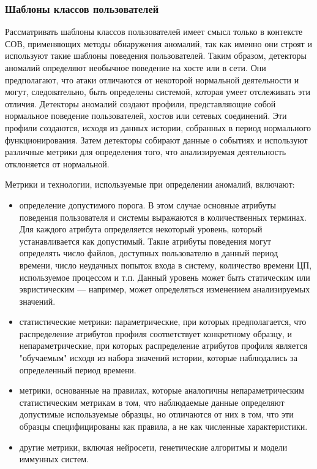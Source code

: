 \subsubsection{Шаблоны классов пользователей}

Рассматривать шаблоны классов пользователей имеет смысл только в контексте СОВ, применяющих методы 
обнаружения аномалий, так как именно они строят и используют такие шаблоны поведения пользователей.
Таким образом, детекторы аномалий определяют необычное поведение на хосте или в сети. 
Они предполагают, что атаки отличаются от некоторой нормальной деятельности и могут, следовательно, 
быть определены системой, которая умеет отслеживать эти отличия. Детекторы аномалий создают профили, 
представляющие собой нормальное поведение пользователей, хостов или сетевых соединений. 
Эти профили создаются, исходя из данных истории, собранных в период нормального функционирования. 
Затем детекторы собирают данные о событиях и используют различные метрики для определения того, 
что анализируемая деятельность отклоняется от нормальной.

Метрики и технологии, используемые при определении аномалий, включают:

\begin{itemize}
	\item определение допустимого порога. В этом случае основные атрибуты поведения пользователя и системы 
	выражаются в количественных терминах. Для каждого атрибута определяется некоторый уровень, который 
	устанавливается как допустимый. Такие атрибуты поведения могут определять число файлов, доступных 
	пользователю в данный период времени, число неудачных попыток входа в систему, количество времени ЦП, 
	используемое процессом и т.п. Данный уровень может быть статическим или эвристическим — например, может 
	определяться изменением анализируемых значений.
	\item статистические метрики: параметрические, при которых предполагается, что распределение 
	атрибутов профиля соответствует конкретному образцу, и непараметрические, при которых распределение 
	атрибутов профиля является "обучаемым" исходя из набора значений истории, которые наблюдались за 
	определенный период времени.
	\item метрики, основанные на правилах, которые аналогичны непараметрическим статистическим метрикам в 
	том, что наблюдаемые данные определяют допустимые используемые образцы, но отличаются от них в том, 
	что эти образцы специфицированы как правила, а не как численные характеристики.
	\item другие метрики, включая нейросети, генетические алгоритмы и модели иммунных систем.
\end{itemize}

